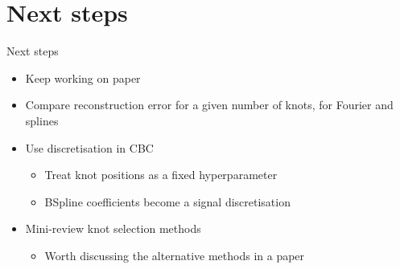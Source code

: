 \documentclass[presentation]{beamer}
\begin{document}
\section{Next steps}
\label{sec:org1f6417a}
\begin{frame}[label={sec:orge966924}]{Next steps}
\begin{itemize}
\item Keep working on paper
\item Compare reconstruction error for a given number of knots, for Fourier and splines
\item Use discretisation in CBC
\begin{itemize}
\item Treat knot positions as a fixed hyperparameter
\item BSpline coefficients become a signal discretisation
\end{itemize}
\item Mini-review knot selection methods
\begin{itemize}
\item Worth discussing the alternative methods in a paper
\end{itemize}
\end{itemize}
\end{frame}
\end{document}
